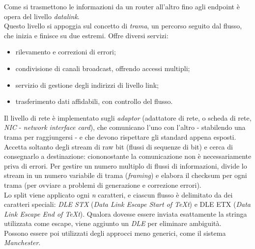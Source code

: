 Come si trasmettono le informazioni da un router all'altro fino agli endpoint è opera del livello \textit{datalink}. \\
Questo livello si appoggia sul concetto di \textit{trama}, un percorso seguito dal flusso, che inizia e finisce su due estremi. Offre diversi servizi:
\begin{itemize}
	\item rilevamento e correzioni di errori;
	\item condivisione di canali broadcast, offrendo accessi multipli;
	\item servizio di gestione degli indirizzi di livello link;
	\item trasferimento dati affidabili, con controllo del flusso.
\end{itemize}
Il livello di rete è implementato sugli \textit{adaptor} (adattatore di rete, o scheda di rete, \textit{NIC} - \textit{network interface card}), che comunicano l'uno con l'altro - stabilendo una trama per raggiungersi - e che devono rispettare gli standard appena esposti. \\
Accetta soltanto degli stream di raw bit (flussi di sequenze di bit) e cerca di consegnarlo a destinazione: ciononostante la comunicazione non è necessariamente priva di errori. Per gestire un numero multiplo di flussi di informazioni, divide lo stream in un numero variabile di trama (\textit{framing}) e elabora il checksum per ogni trama (per ovviare a problemi di generazione e correzione errori). \\
Lo split viene applicato ogni \textit{n} caratteri, e ciascun flusso è delimitato da dei caratteri speciali: \textit{DLE STX} (\textit{Data Link Escape Start of TeXt}) e DLE ETX (\textit{Data Link Escape End of TeXt}). Qualora dovesse essere inviata esattamente la stringa utilizzata come escape, viene aggiunto un \textit{DLE} per eliminare ambiguità. \\
Possono essere poi utilizzati degli approcci meno generici, come il sistema \textit{Manchester}.

